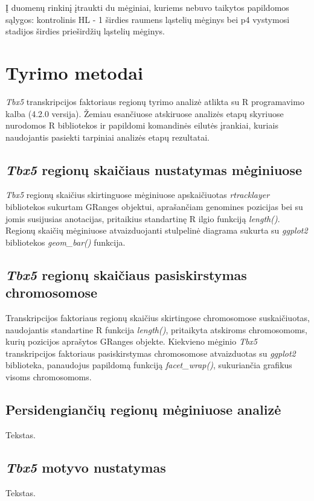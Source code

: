 \documentclass[11pt]{article}
\begin{document}
Į duomenų rinkinį įtraukti du mėginiai, kuriems nebuvo taikytos papildomos
sąlygos: kontrolinis HL - 1 širdies raumens ląstelių mėginys bei p4
vystymosi stadijos širdies prieširdžių ląstelių mėginys.
\newpage


\section{Tyrimo metodai}
\emph{Tbx5} transkripcijos faktoriaus regionų tyrimo analizė atlikta
su R programavimo kalba (4.2.0 versija). Žemiau esančiuose atskiruose
analizės etapų skyriuose nurodomos R bibliotekos ir papildomi komandinės
eilutės įrankiai, kuriais naudojantis pasiekti tarpiniai analizės etapų
rezultatai.

\subsection{\emph{Tbx5} regionų skaičiaus nustatymas mėginiuose}
\emph{Tbx5} regionų skaičius skirtinguose mėginiuose apskaičiuotas
\emph{rtracklayer} bibliotekos sukurtam GRanges objektui, aprašančiam
genomines pozicijas bei su jomis susijusias anotacijas, pritaikius
standartinę R ilgio funkciją \emph{length()}.
Regionų skaičių mėginiuose atvaizduojanti stulpelinė diagrama sukurta
su \emph{ggplot2} bibliotekos \emph{geom\_bar()} funkcija.

\subsection{\emph{Tbx5} regionų skaičiaus pasiskirstymas chromosomose}
Transkripcijos faktoriaus regionų skaičius skirtingose chromosomose
suskaičiuotas, naudojantis standartine R funkcija \emph{length()},
pritaikyta atskiroms chromosomoms, kurių pozicijos aprašytos GRanges
objekte.
Kiekvieno mėginio \emph{Tbx5} transkripcijos faktoriaus pasiskirstymas
chromosomose atvaizduotas su \emph{ggplot2} biblioteka, panaudojus
papildomą funkciją \emph{facet\_wrap()}, sukuriančia grafikus visoms
chromosomoms.

\subsection{Persidengiančių regionų mėginiuose analizė}
Tekstas.

\subsection{\emph{Tbx5} motyvo nustatymas}
Tekstas.
\end{document}
